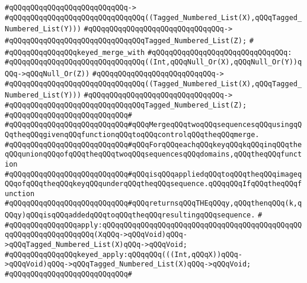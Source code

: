 \verb|#qQQqqQQqqQQqqQQqqQQqqQQqqQQq->|\newline
\verb|#qQQqqQQqqQQqqQQqqQQqqQQqqQQqqQQq((Tagged_Numbered_List(X),qQQqTagged_Numbered_List(Y)))|\newline
\verb|#qQQqqQQqqQQqqQQqqQQqqQQqqQQqqQQq->|\newline
\verb|#qQQqqQQqqQQqqQQqqQQqqQQqqQQqqQQqTagged_Numbered_List(Z);|\newline
\verb|#|\newline
\verb|#qQQqqQQqqQQqqQQqkeyed_merge_with|\newline
\verb|#qQQqqQQqqQQqqQQqqQQqqQQqqQQqqQQq:|\newline
\verb|#qQQqqQQqqQQqqQQqqQQqqQQqqQQqqQQq((Int,qQQqNull_Or(X),qQQqNull_Or(Y))qQQq->qQQqNull_Or(Z))|\newline
\verb|#qQQqqQQqqQQqqQQqqQQqqQQqqQQq->|\newline
\verb|#qQQqqQQqqQQqqQQqqQQqqQQqqQQqqQQq((Tagged_Numbered_List(X),qQQqTagged_Numbered_List(Y)))|\newline
\verb|#qQQqqQQqqQQqqQQqqQQqqQQqqQQqqQQq->|\newline
\verb|#qQQqqQQqqQQqqQQqqQQqqQQqqQQqqQQqTagged_Numbered_List(Z);|\newline
\verb|#qQQqqQQqqQQqqQQqqQQqqQQqqQQq#|\newline
\verb|#qQQqqQQqqQQqqQQqqQQqqQQqqQQq#qQQqMergeqQQqtwoqQQqsequencesqQQqusingqQQqtheqQQqgivenqQQqfunctionqQQqtoqQQqcontrolqQQqtheqQQqmerge.|\newline
\verb|#qQQqqQQqqQQqqQQqqQQqqQQqqQQq#qQQqForqQQqeachqQQqkeyqQQqkqQQqinqQQqtheqQQqunionqQQqofqQQqtheqQQqtwoqQQqsequencesqQQqdomains,qQQqtheqQQqfunction|\newline
\verb|#qQQqqQQqqQQqqQQqqQQqqQQqqQQq#qQQqisqQQqappliedqQQqtoqQQqtheqQQqimageqQQqofqQQqtheqQQqkeyqQQqunderqQQqtheqQQqsequence.qQQqqQQqIfqQQqtheqQQqfunction|\newline
\verb|#qQQqqQQqqQQqqQQqqQQqqQQqqQQq#qQQqreturnsqQQqTHEqQQqy,qQQqthenqQQq(k,qQQqy)qQQqisqQQqaddedqQQqtoqQQqtheqQQqresultingqQQqsequence.|\newline
\verb|#|\newline
\verb|#qQQqqQQqqQQqqQQqapply:qQQqqQQqqQQqqQQqqQQqqQQqqQQqqQQqqQQqqQQqqQQqqQQqqQQqqQQqqQQqqQQqqQQq(XqQQq->qQQqVoid)qQQq->qQQqTagged_Numbered_List(X)qQQq->qQQqVoid;|\newline
\verb|#qQQqqQQqqQQqqQQqkeyed_apply:qQQqqQQq(((Int,qQQqX))qQQq->qQQqVoid)qQQq->qQQqTagged_Numbered_List(X)qQQq->qQQqVoid;|\newline
\verb|#qQQqqQQqqQQqqQQqqQQqqQQqqQQq#|\newline
